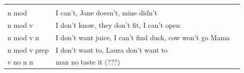 \documentclass[man]{apa6}
\begin{document}
\begin{longtable}[]{@{}lll@{}}
\begin{minipage}[t]{0.27\columnwidth}
\strut
\end{minipage}\tabularnewline
\begin{minipage}[t]{0.21\columnwidth}\raggedright\strut
n mod\strut
\end{minipage} & \begin{minipage}[t]{0.43\columnwidth}\raggedright\strut
I can't, Jane doesn't, mine didn't\strut
\end{minipage} & \begin{minipage}[t]{0.27\columnwidth}\raggedright\strut
\strut
\end{minipage}\tabularnewline
\begin{minipage}[t]{0.21\columnwidth}\raggedright\strut
n mod v\strut
\end{minipage} & \begin{minipage}[t]{0.43\columnwidth}\raggedright\strut
I don't know, they don't fit, I can't open\strut
\end{minipage} & \begin{minipage}[t]{0.27\columnwidth}\raggedright\strut
\strut
\end{minipage}\tabularnewline
\begin{minipage}[t]{0.21\columnwidth}\raggedright\strut
n mod v n\strut
\end{minipage} & \begin{minipage}[t]{0.43\columnwidth}\raggedright\strut
I don't want juice, I can't find duck, cow won't go Mama\strut
\end{minipage} & \begin{minipage}[t]{0.27\columnwidth}\raggedright\strut
\strut
\end{minipage}\tabularnewline
\begin{minipage}[t]{0.21\columnwidth}\raggedright\strut
n mod v prep\strut
\end{minipage} & \begin{minipage}[t]{0.43\columnwidth}\raggedright\strut
I don't want to, Laura don't want to\strut
\end{minipage} & \begin{minipage}[t]{0.27\columnwidth}\raggedright\strut
\strut
\end{minipage}\tabularnewline
\begin{minipage}[t]{0.21\columnwidth}\raggedright\strut
v no n n\strut
\end{minipage} & \begin{minipage}[t]{0.43\columnwidth}\raggedright\strut
man no taste it (???)\strut
\end{minipage} & \begin{minipage}[t]{0.27\columnwidth}\raggedright\strut
\strut
\end{minipage}\tabularnewline
\bottomrule
\end{longtable}
\end{document}
